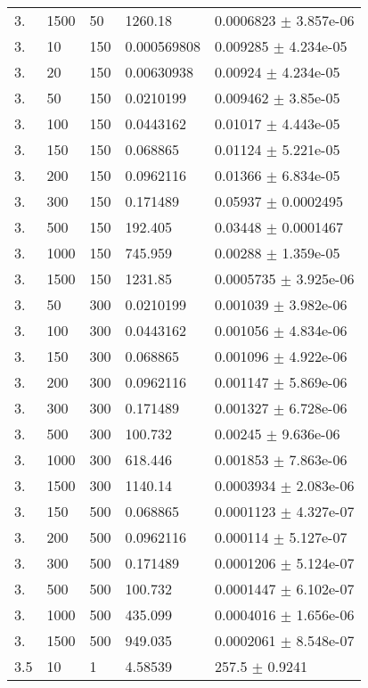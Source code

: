 \begin{longtable}{lllll}
  3. &  1500 &    50 &  1260.18 & 0.0006823 $\pm$ 3.857e-06 \\
  3. &    10 &   150 & 0.000569808 & 0.009285 $\pm$ 4.234e-05 \\
  3. &    20 &   150 & 0.00630938 &  0.00924 $\pm$ 4.234e-05 \\
  3. &    50 &   150 & 0.0210199 & 0.009462 $\pm$ 3.85e-05 \\
  3. &   100 &   150 & 0.0443162 &  0.01017 $\pm$ 4.443e-05 \\
  3. &   150 &   150 & 0.068865 &  0.01124 $\pm$ 5.221e-05 \\
  3. &   200 &   150 & 0.0962116 &  0.01366 $\pm$ 6.834e-05 \\
  3. &   300 &   150 & 0.171489 &  0.05937 $\pm$ 0.0002495 \\
  3. &   500 &   150 &  192.405 &  0.03448 $\pm$ 0.0001467 \\
  3. &  1000 &   150 &  745.959 &  0.00288 $\pm$ 1.359e-05 \\
  3. &  1500 &   150 &  1231.85 & 0.0005735 $\pm$ 3.925e-06 \\
  3. &    50 &   300 & 0.0210199 & 0.001039 $\pm$ 3.982e-06 \\
  3. &   100 &   300 & 0.0443162 & 0.001056 $\pm$ 4.834e-06 \\
  3. &   150 &   300 & 0.068865 & 0.001096 $\pm$ 4.922e-06 \\
  3. &   200 &   300 & 0.0962116 & 0.001147 $\pm$ 5.869e-06 \\
  3. &   300 &   300 & 0.171489 & 0.001327 $\pm$ 6.728e-06 \\
  3. &   500 &   300 &  100.732 &  0.00245 $\pm$ 9.636e-06 \\
  3. &  1000 &   300 &  618.446 & 0.001853 $\pm$ 7.863e-06 \\
  3. &  1500 &   300 &  1140.14 & 0.0003934 $\pm$ 2.083e-06 \\
  3. &   150 &   500 & 0.068865 & 0.0001123 $\pm$ 4.327e-07 \\
  3. &   200 &   500 & 0.0962116 & 0.000114 $\pm$ 5.127e-07 \\
  3. &   300 &   500 & 0.171489 & 0.0001206 $\pm$ 5.124e-07 \\
  3. &   500 &   500 &  100.732 & 0.0001447 $\pm$ 6.102e-07 \\
  3. &  1000 &   500 &  435.099 & 0.0004016 $\pm$ 1.656e-06 \\
  3. &  1500 &   500 &  949.035 & 0.0002061 $\pm$ 8.548e-07 \\
 3.5 &    10 &     1 &  4.58539 &    257.5 $\pm$   0.9241 \\

\end{longtable}
